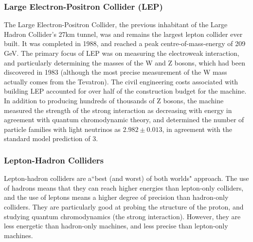 \subsubsection{Large Electron-Positron Collider (LEP)}
The Large Electron-Positron Collider, the previous inhabitant of the Large Hadron Collider's 27km tunnel, was and remains the largest lepton collider ever built. It was completed in 1988, and reached a peak centre-of-mass-energy of 209 GeV\cite{CERN:LEP:Online}. The primary focus of LEP was on measuring the electroweak interaction, and particularly determining the masses of the W and Z bosons, which had been discovered in 1983 (although the most precise measurement of the W mass actually comes from the Tevatron\cite{Butterworth:Interview}). The civil engineering costs associated with building LEP accounted for over half of the construction budget for the machine\cite{LEP:History:Online}. In addition to producing hundreds of thousands of Z bosons\cite{LEP:History:Online}, the machine measured the strength of the strong interaction as decreasing with energy in agreement with quantum chromodynamic theory, and determined the number of particle families with light neutrinos as $2.982\pm 0.013$, in agreement with the standard model prediction of 3\cite{ALEPH:Physics:Online}.

\subsubsection{Lepton-Hadron Colliders}
Lepton-hadron colliders are a``best (and worst) of both worlds" approach. The use of hadrons means that they can reach higher energies than lepton-only colliders, and the use of leptons means a higher degree of precision than hadron-only colliders. They are particularly good at probing the structure of the proton, and studying quantum chromodynamics (the strong interaction)\cite{Waters:Interview,Thorne:Interview,Butterworth:Interview}. However, they are less energetic than hadron-only machines, and less precise than lepton-only machines.


